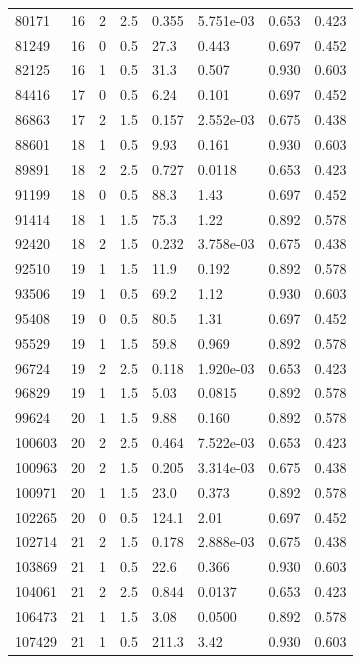 \documentclass[preview]{standalone}
\begin{document}
{{{\begin{tabular}{L{1.2cm}C{1.2cm} C{0.3cm}C{0.5cm} C{1.4cm}C{1.4cm} C{1.4cm}C{1.4cm}}
  80171  &    16  & 2     & 2.5 &  0.355  & 5.751e-03  & 0.653 &  0.423   \\ 
  81249  &    16  & 0     & 0.5 &  27.3  & 0.443  & 0.697 &  0.452   \\ 
  82125  &    16  & 1     & 0.5 &  31.3  & 0.507  & 0.930 &  0.603   \\ 
  84416  &    17  & 0     & 0.5 &  6.24  & 0.101  & 0.697 &  0.452   \\ 
  86863  &    17  & 2     & 1.5 &  0.157  & 2.552e-03  & 0.675 &  0.438   \\ 
  88601  &    18  & 1     & 0.5 &  9.93  & 0.161  & 0.930 &  0.603   \\ 
  89891  &    18  & 2     & 2.5 &  0.727  & 0.0118  & 0.653 &  0.423   \\ 
  91199  &    18  & 0     & 0.5 &  88.3  & 1.43  & 0.697 &  0.452   \\ 
  91414  &    18  & 1     & 1.5 &  75.3  & 1.22  & 0.892 &  0.578   \\ 
  92420  &    18  & 2     & 1.5 &  0.232  & 3.758e-03  & 0.675 &  0.438   \\ 
  92510  &    19  & 1     & 1.5 &  11.9  & 0.192  & 0.892 &  0.578   \\ 
  93506  &    19  & 1     & 0.5 &  69.2  & 1.12  & 0.930 &  0.603   \\ 
  95408  &    19  & 0     & 0.5 &  80.5  & 1.31  & 0.697 &  0.452   \\ 
  95529  &    19  & 1     & 1.5 &  59.8  & 0.969  & 0.892 &  0.578   \\ 
  96724  &    19  & 2     & 2.5 &  0.118  & 1.920e-03  & 0.653 &  0.423   \\ 
  96829  &    19  & 1     & 1.5 &  5.03  & 0.0815  & 0.892 &  0.578   \\ 
  99624  &    20  & 1     & 1.5 &  9.88  & 0.160  & 0.892 &  0.578   \\ 
  100603  &    20  & 2     & 2.5 &  0.464  & 7.522e-03  & 0.653 &  0.423   \\ 
  100963  &    20  & 2     & 1.5 &  0.205  & 3.314e-03  & 0.675 &  0.438   \\ 
  100971  &    20  & 1     & 1.5 &  23.0  & 0.373  & 0.892 &  0.578   \\ 
  102265  &    20  & 0     & 0.5 &  124.1  & 2.01  & 0.697 &  0.452   \\ 
  102714  &    21  & 2     & 1.5 &  0.178  & 2.888e-03  & 0.675 &  0.438   \\ 
  103869  &    21  & 1     & 0.5 &  22.6  & 0.366  & 0.930 &  0.603   \\ 
  104061  &    21  & 2     & 2.5 &  0.844  & 0.0137  & 0.653 &  0.423   \\ 
  106473  &    21  & 1     & 1.5 &  3.08  & 0.0500  & 0.892 &  0.578   \\ 
  107429  &    21  & 1     & 0.5 &  211.3  & 3.42  & 0.930 &  0.603   \\ 
\hline 
\end{tabular} 

}}}
\end{document}
